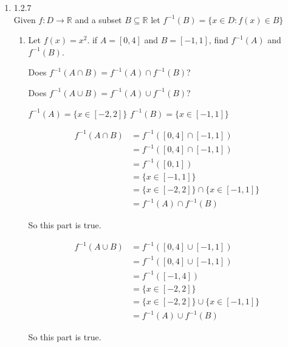 \documentclass[12pt,letterpaper]{article}
\begin{document}
\begin{enumerate}
\begin{proof}
\begin{enumerate}
            By the definition of inclusion, we can say:
            \[A^c \cap B^c \subseteq (A \cup B)^c\]
        \end{enumerate}

        From a and b we have both sides of inclusion,
        so by the definition of set equality:
        \[(A \cup B)^c = A^c \cap B^c\]
      \end{proof}

    \item 1.2.7 \\
      Given $f : D \to \mathbb{R}$ and a subset $B \subseteq \mathbb{R}$
      let $f^{-1}(B) = \{x \in D : f(x) \in B\}$
      \begin{enumerate}
        \item Let $f(x) = x^2$.
        if $A = [0,4]$ and $B = [-1,1]$,
        find $f^{-1}(A)$ and $f^{-1}(B)$.

        Does $f^{-1}(A \cap B) = f^{-1}(A) \cap f^{-1}(B)$?

        Does $f^{-1}(A \cup B) = f^{-1}(A) \cup f^{-1}(B)$?

        $f^{-1}(A) = \{x \in [-2,2]\}$
        $f^{-1}(B) = \{x \in [-1,1]\}$

        \begin{align*}
          f^{-1}(A \cap B) &= f^{-1}([0,4] \cap [-1,1]) \\
          &= f^{-1}([0,4] \cap [-1,1]) \\
          &= f^{-1}([0,1]) \\
          &= \{x \in [-1,1]\} \\
          &= \{x \in [-2,2] \} \cap \{x \in [-1,1]\} \\
          &= f^{-1}(A) \cap f^{-1}(B)
        \end{align*}

        So this part is true.

        \begin{align*}
          f^{-1}(A \cup B) &= f^{-1}([0,4] \cup [-1,1]) \\
          &= f^{-1}([0,4] \cup [-1,1]) \\
          &= f^{-1}([-1,4]) \\
          &= \{x \in [-2,2]\} \\
          &= \{x \in [-2,2] \} \cup \{x \in [-1,1]\} \\
          &= f^{-1}(A) \cup f^{-1}(B)
        \end{align*}

        So this part is true.

      \end{enumerate}
  \end{enumerate}
\end{document}
